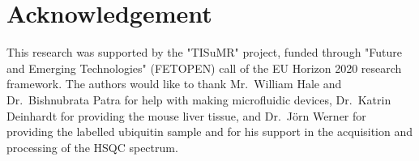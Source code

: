 \documentclass[preprint,12pt]{article}
\begin{document}
\section{Acknowledgement}
This research was supported by the "TISuMR" project,
funded through "Future and Emerging Technologies" (FETOPEN) 
call of the EU Horizon 2020 research framework. The authors would like to 
thank Mr.~William Hale and Dr.~Bishnubrata Patra for help with
making microfluidic devices, Dr.~Katrin Deinhardt for providing 
the mouse liver tissue, and Dr.~Jörn Werner for providing the 
labelled ubiquitin sample and for his support in the acquisition
and processing of the HSQC spectrum.
\clearpage


\end{document}
